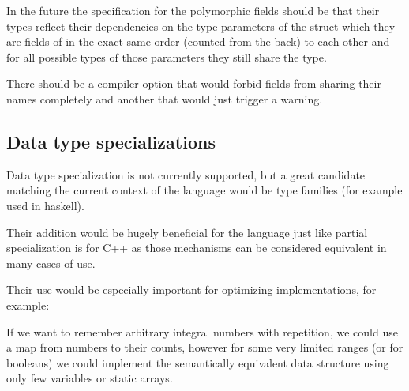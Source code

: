 In the future the specification for the polymorphic fields should be that their types reflect their dependencies on the type
parameters of the struct which they are fields of in the exact same order (counted from the back) to each other and for all possible types of those parameters they
still share the type.

There should be a compiler option that would forbid fields from sharing their names completely and another that would just trigger a warning.

\subsection{Data type specializations}

Data type specialization is not currently supported, but a great candidate matching the current context of the language would be
type families (for example used in haskell).

Their addition would be hugely beneficial for the language just like partial specialization is for C++ as
those mechanisms can be considered equivalent in many cases of use.

Their use would be especially important for optimizing implementations, for example:

If we want to remember arbitrary integral numbers with repetition, we could use a map from numbers to their counts,
however for some very limited ranges (or for booleans) we could implement the semantically equivalent data structure using
only few variables or static arrays.

